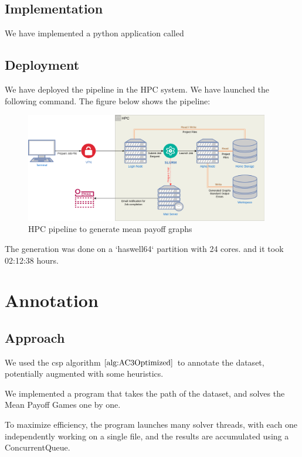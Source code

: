 \subsection{Implementation}
We have implemented a python application called 
\subsection{Deployment}
We have deployed the pipeline in the HPC system. We have launched the following command.
\newline The figure below shows the pipeline:
\begin{figure}[H]
	\centering
	\includegraphics[width=0.95\textwidth]{Figures/DatasetGeneration.png}
	\caption{HPC pipeline to generate mean payoff graphs}
\end{figure}
\FloatBarrier
The generation was done on a `haswell64` partition with 24 cores. and it took 02:12:38 hours.

\section{Annotation}
\subsection{Approach}
We used the \acrfull{csp} algorithm $\ref{alg:AC3Optimized}$ to annotate the dataset, potentially augmented with some heuristics.

We implemented a program that takes the path of the dataset, and solves the Mean Payoff Games one by one.

To maximize efficiency, the program launches many solver threads, with each one independently working on a single file, and the results are accumulated using a ConcurrentQueue.
